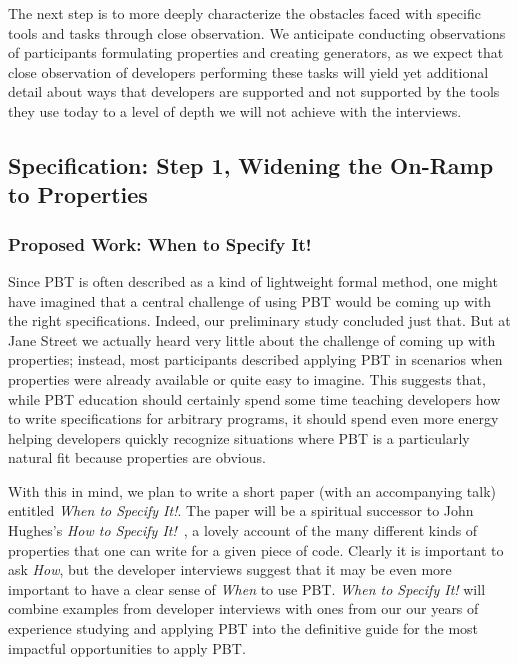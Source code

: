 The next step is to more deeply characterize the obstacles faced with specific
tools and tasks through close observation. We anticipate conducting observations
of participants formulating properties and creating generators, as we expect
that close observation of developers performing these tasks will yield yet
additional detail about ways that developers are supported and not supported by
the tools they use today to a level of depth we will not achieve with the
interviews.

\subsection{Specification: Step 1, Widening the On-Ramp to Properties }
\subsubsection{Proposed Work: When to Specify It!}
Since PBT is often described as a kind of lightweight formal method, one might
have imagined that a central challenge of using PBT would be coming up with the
right specifications. Indeed, our preliminary study concluded just that. But at
Jane Street we actually heard very little about the challenge of coming up with
properties; instead, most participants described applying PBT in scenarios when
properties were already available or quite easy to imagine. This suggests that,
while PBT education should certainly spend some time teaching developers how to
write specifications for arbitrary programs, it should spend even more energy
helping developers quickly recognize  situations where PBT is a particularly
natural fit because properties are obvious.

With this in mind, we plan to write a short paper (with an accompanying talk)
entitled {\em When to Specify It!}. The paper will be a spiritual successor to
John Hughes's {\em How to Specify It!}~\cite{HowToSpecifyIt}, a lovely account
of the many different kinds of properties that one can write for a given piece
of code. Clearly it is important to ask {\em How}, but the developer interviews
suggest that it may be even more important to have a clear sense of {\em When}
to use PBT. {\em When to Specify It!} will combine examples from developer
interviews with ones from our our years of experience studying and applying PBT
into the definitive guide for the most impactful opportunities to apply PBT.

